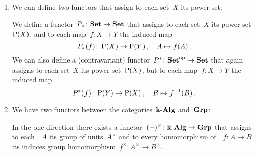 \begin{example}
  \label{examples for functors}
  \leavevmode
  \begin{enumerate}
    \item
      We can define two functors that assign to each set~$X$ its power set:
      
      We define a functor~$P_* \colon \mathbf{Set} \to \mathbf{Set}$ that assigns to each set~$X$ its power set~$\operatorname{P}(X)$, and to each map~$f \colon X \to Y$ the induced map
      \[
                P_*(f)
        \colon  \operatorname{P}(X)
        \to     \operatorname{P}(Y) \,,
        \quad   A
        \mapsto f(A) \,.
      \]
      We can also define a (contravariant) functor~$P^* \colon \mathbf{Set}^{\mathrm{op}} \to \mathbf{Set}$ that again assigns to each set~$X$ its power set~$\operatorname{P}(X)$, but to each map~$f \colon X \to Y$ the induced map
      \[
                P^*(f)
        \colon  \operatorname{P}(Y)
        \to     \operatorname{P}(X) \,,
        \quad   B
        \mapsto f^{-1}(B) \,.
      \]
    \item
      We have two functors between the categories~$\text{$\mathbf{k}$-$\mathbf{Alg}$}$ and~$\mathbf{Grp}$:
      
      In the one direction there exists a functor~$(-)^\times \colon \text{$\mathbf{k}$-$\mathbf{Alg}$} \to \mathbf{Grp}$ that assigns to each~{\kalg}~$A$ its group of units~$A^\times$ and to every homomorphism of~{\kalgs}~$f \colon A \to B$ its induces group homomorphism~$f^\times \colon A^\times \to B^\times$.
      

\end{enumerate}
\end{example}

